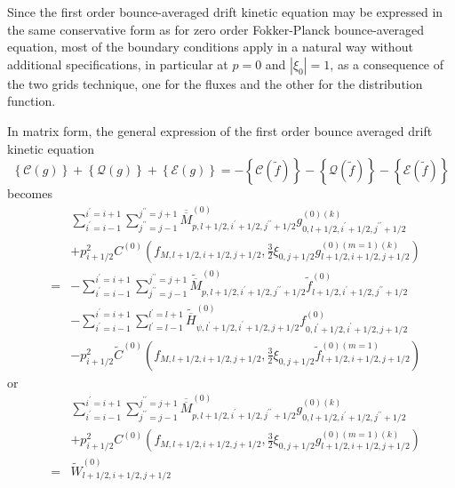 
\label{dkeboundaries}Since the first order bounce-averaged drift
kinetic equation may be expressed in the same conservative form as
for zero order Fokker-Planck bounce-averaged equation, most of the
boundary conditions apply in a natural way without additional
specifications, in particular at $p=0$ and $\left| \xi _{0}\right|
=1$, as a consequence of the two grids technique, one for the fluxes
and the other for the distribution function.

In matrix form, the general expression of the first order bounce averaged
drift kinetic equation
\begin{equation}
\left\{ \mathcal{C}\left( g\right) \right\} +\left\{ \mathcal{Q}\left(
g\right) \right\} +\left\{ \mathcal{E}\left( g\right) \right\} =-\left\{
\mathcal{C}\left( \widetilde{f}\right) \right\} -\left\{ \mathcal{Q}\left(
\widetilde{f}\right) \right\} -\left\{ \mathcal{E}\left( \widetilde{f}%
\right) \right\}
\end{equation}
becomes
\begin{eqnarray}
&&\sum_{i^{\prime }=i-1}^{i^{\prime }=i+1}\sum_{j^{\prime \prime
}=j-1}^{j^{\prime \prime }=j+1}\overline{\overline{M}}_{p,l+1/2,i^{\prime
}+1/2,j^{\prime \prime }+1/2}^{\left( 0\right) }g_{0,l+1/2,i^{\prime
}+1/2,j^{\prime \prime }+1/2}^{\left( 0\right) (k)}  \nonumber \\
&&+p_{i+1/2}^{2}C^{\left( 0\right) }\left( f_{M,l+1/2,i+1/2,j+1/2},\frac{3}{2%
}\xi _{0,j+1/2}g_{l+1/2,i+1/2,j+1/2}^{\left( 0\right) (m=1)(k)}\right)
\nonumber \\
&=&-\sum_{i^{\prime }=i-1}^{i^{\prime }=i+1}\sum_{j^{\prime \prime
}=j-1}^{j^{\prime \prime }=j+1}\widetilde{\overline{M}}_{p,l+1/2,i^{\prime
}+1/2,j^{\prime \prime }+1/2}^{\left( 0\right) }\widetilde{f}%
_{l+1/2,i^{\prime }+1/2,j^{\prime \prime }+1/2}^{\left( 0\right) }  \nonumber
\\
&&-\sum_{i^{\prime }=i-1}^{i^{\prime }=i+1}\sum_{l^{\prime }=l-1}^{l^{\prime
}=l+1}\widetilde{\overline{H}}_{\psi ,l^{\prime }+1/2,i^{\prime
}+1/2,j+1/2}^{\left( 0\right) }f_{0,l^{\prime }+1/2,i^{\prime
}+1/2,j+1/2}^{\left( 0\right) }  \nonumber \\
&&-p_{i+1/2}^{2}\widetilde{C}^{\left( 0\right) }\left(
f_{M,l+1/2,i+1/2,j+1/2},\frac{3}{2}\xi _{0,j+1/2}\widetilde{f}
_{l+1/2,i+1/2,j+1/2}^{\left( 0\right) (m=1)}\right)
\end{eqnarray}
or
\begin{eqnarray}
&&\sum_{i^{\prime }=i-1}^{i^{\prime }=i+1}\sum_{j^{\prime \prime
}=j-1}^{j^{\prime \prime }=j+1}\overline{\overline{M}}_{p,l+1/2,i^{\prime
}+1/2,j^{\prime \prime }+1/2}^{\left( 0\right) }g_{0,l+1/2,i^{\prime
}+1/2,j^{\prime \prime }+1/2}^{\left( 0\right) (k)}  \nonumber \\
&&+p_{i+1/2}^{2}C^{\left( 0\right) }\left( f_{M,l+1/2,i+1/2,j+1/2},\frac{3}{2%
}\xi _{0,j+1/2}g_{l+1/2,i+1/2,j+1/2}^{\left( 0\right) (m=1)(k)}\right)
\nonumber \\
&=&\widetilde{W}_{l+1/2,i+1/2,j+1/2}^{\left( 0\right) }
\end{eqnarray}

